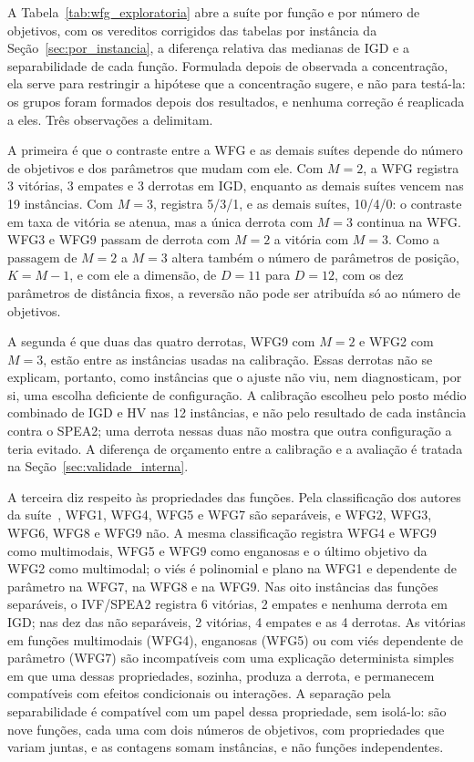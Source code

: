 A Tabela~\ref{tab:wfg_exploratoria} abre a suíte por função e por número de objetivos, com os vereditos corrigidos das tabelas por instância da Seção~\ref{sec:por_instancia}, a diferença relativa das medianas de IGD e a separabilidade de cada função. Formulada depois de observada a concentração, ela serve para restringir a hipótese que a concentração sugere, e não para testá-la: os grupos foram formados depois dos resultados, e nenhuma correção é reaplicada a eles. Três observações a delimitam.



A primeira é que o contraste entre a WFG e as demais suítes depende do número de objetivos e dos parâmetros que mudam com ele. Com $M = 2$, a WFG registra 3 vitórias, 3 empates e 3 derrotas em IGD, enquanto as demais suítes vencem nas 19 instâncias. Com $M = 3$, registra 5/3/1, e as demais suítes, 10/4/0: o contraste em taxa de vitória se atenua, mas a única derrota com $M = 3$ continua na WFG. WFG3 e WFG9 passam de derrota com $M = 2$ a vitória com $M = 3$. Como a passagem de $M = 2$ a $M = 3$ altera também o número de parâmetros de posição, $K = M - 1$, e com ele a dimensão, de $D = 11$ para $D = 12$, com os dez parâmetros de distância fixos, a reversão não pode ser atribuída só ao número de objetivos.

A segunda é que duas das quatro derrotas, WFG9 com $M = 2$ e WFG2 com $M = 3$, estão entre as instâncias usadas na calibração. Essas derrotas não se explicam, portanto, como instâncias que o ajuste não viu, nem diagnosticam, por si, uma escolha deficiente de configuração. A calibração escolheu pelo posto médio combinado de IGD e HV nas 12 instâncias, e não pelo resultado de cada instância contra o SPEA2; uma derrota nessas duas não mostra que outra configuração a teria evitado. A diferença de orçamento entre a calibração e a avaliação é tratada na Seção~\ref{sec:validade_interna}.

A terceira diz respeito às propriedades das funções. Pela classificação dos autores da suíte~\cite{huband2006review}, WFG1, WFG4, WFG5 e WFG7 são separáveis, e WFG2, WFG3, WFG6, WFG8 e WFG9 não. A mesma classificação registra WFG4 e WFG9 como multimodais, WFG5 e WFG9 como enganosas e o último objetivo da WFG2 como multimodal; o viés é polinomial e plano na WFG1 e dependente de parâmetro na WFG7, na WFG8 e na WFG9. Nas oito instâncias das funções separáveis, o IVF/SPEA2 registra 6 vitórias, 2 empates e nenhuma derrota em IGD; nas dez das não separáveis, 2 vitórias, 4 empates e as 4 derrotas. As vitórias em funções multimodais (WFG4), enganosas (WFG5) ou com viés dependente de parâmetro (WFG7) são incompatíveis com uma explicação determinista simples em que uma dessas propriedades, sozinha, produza a derrota, e permanecem compatíveis com efeitos condicionais ou interações. A separação pela separabilidade é compatível com um papel dessa propriedade, sem isolá-lo: são nove funções, cada uma com dois números de objetivos, com propriedades que variam juntas, e as contagens somam instâncias, e não funções independentes.

